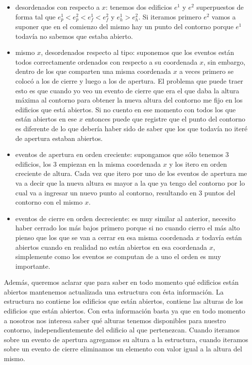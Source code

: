 \begin{itemize}
	\item desordenados con respecto a $x$: tenemos dos edificios $e^1$ y $e^2$ superpuestos de forma tal que
	$e^1_p < e^2_p < e^1_f < e^2_f$ y $e^1_h > e^2_h$. Si iteramos primero $e^2$ vamos a suponer que en el comienzo
	del mismo hay un punto del contorno porque $e^1$ todavía no sabemos que estaba abierto.
	\item mismo $x$, desordenados respecto al tipo: suponemos que los eventos están todos correctamente ordenados
	con respecto a su coordenada $x$, sin embargo, dentro de los que comparten una misma coordenada $x$ a veces primero
	se colocó a los de cierre y luego a los de apertura. El problema que puede traer esto es que cuando yo veo
	un evento de cierre que era el que daba la altura máxima al contorno para obtener la nueva altura del contorno
	me fijo en los edificios que está abiertos. Si no cuento en ese momento con todos los que están abiertos
	en ese $x$ entonces puede que registre que el punto del contorno es diferente de lo que debería haber sido
	de saber que los que todavía no iteré de apertura estaban abiertos.
	\item eventos de apertura en orden creciente: supongamos que sólo tenemos 3 edificios, los 3 empiezan en
	la misma coordenada $x$ y los itero en orden creciente de altura. Cada vez que itero por uno de los eventos 
	de apertura me va a decir que la nueva altura es mayor a la que ya tengo del contorno por lo cual va a
	ingresar un nuevo punto al contorno, resultando en 3 puntos del contorno con el mismo $x$.
	\item eventos de cierre en orden decreciente: es muy similar al anterior, necesito haber cerrado los más
	bajos primero porque si no cuando cierro el más alto pienso que los que se van a cerrar en esa misma
	coordenada $x$ todavía están abiertos cuando en realidad no están abiertos en esa coordenada $x$, simplemente
	como los eventos se computan de a uno el orden es muy importante.
\end{itemize}
Además, queremos aclarar que para saber en todo momento qué edificios están abiertos mantenemos actualizada
una estructura con ésta información. La estructura no contiene los edificios que están abiertos, contiene
las alturas de los edificios que están abiertos. Con esta información basta ya que en todo momento
a nosotros nos interesa saber qué alturas tenemos disponibles para nuestro contorno, independientemente
del edificio al que pertenezcan. Cuando iteramos sobre un evento de apertura agregamos su altura a la 
estructura, cuando iteramos sobre un evento de cierre eliminamos un elemento con valor igual a la altura
del mismo.

